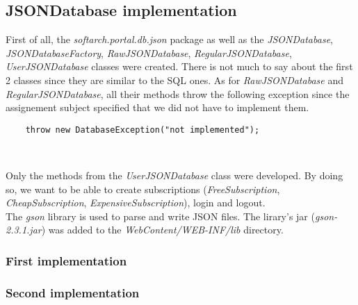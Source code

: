 \subsection{JSONDatabase implementation}

First of all, the \emph{softarch.portal.db.json} package as well as the
\emph{JSONDatabase}, \emph{JSONDatabaseFactory}, \emph{RawJSONDatabase},
\emph{RegularJSONDatabase}, \emph{UserJSONDatabase} classes were
created. There is not much to say about the first 2 classes since they
are similar to the SQL ones. As for \emph{RawJSONDatabase} and
\emph{RegularJSONDatabase}, all their methods throw the following exception
since the assignement subject specified that we did not have to implement them.\\

\begin{lstlisting}
    throw new DatabaseException("not implemented");
\end{lstlisting}
\

Only the methods from the \emph{UserJSONDatabase} class were developed.
By doing so, we want to be able to create subscriptions
(\emph{FreeSubscription}, \emph{CheapSubscription},
\emph{ExpensiveSubscription}), login and logout.\\

The \emph{gson} library is used to parse and write JSON files. The lirary's jar
(\emph{gson-2.3.1.jar}) was added to the \emph{WebContent/WEB-INF/lib}
directory.

\subsubsection{First implementation}

\subsubsection{Second implementation}
